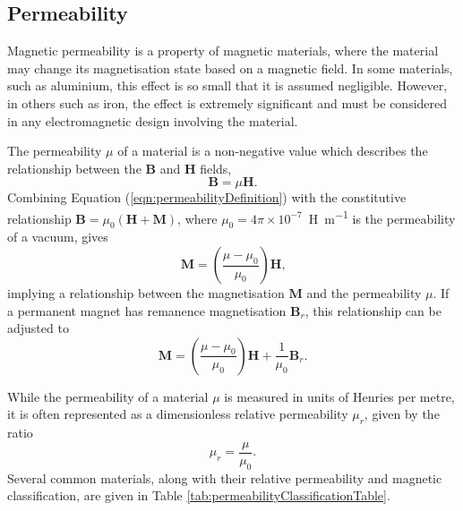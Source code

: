 \subsection{Permeability}
Magnetic permeability is a property of magnetic materials, where the material may change its magnetisation state based on a magnetic field. In some materials, such as aluminium, this effect is so small that it is assumed negligible. However, in others such as iron, the effect is extremely significant and must be considered in any electromagnetic design involving the material.

The permeability \(\mu\) of a material is a non-negative value which describes the relationship between the \(\mathbf{B}\) and \(\mathbf{H}\) fields,
\begin{equation}\label{eqn:permeabilityDefinition}
    \mathbf{B} = \mu \mathbf{H} \text{.}
\end{equation}
Combining Equation (\ref{eqn:permeabilityDefinition}) with the constitutive relationship \(\mathbf{B} = \mu_0 \left( \mathbf{H} + \mathbf{M} \right)\), where \(\mu_0 = 4\pi \times 10^{-7}\)~\si{\henry\per\metre} is the permeability of a vacuum, gives
\begin{equation}
    \mathbf{M} = \left( \frac{\mu-\mu_0}{\mu_0} \right) \mathbf{H} \text{,}
\end{equation}
implying a relationship between the magnetisation \(\mathbf{M}\) and the permeability \(\mu\). If a permanent magnet has remanence magnetisation \(\mathbf{B}_r\), this relationship can be adjusted to
\begin{equation}
    \mathbf{M} = \left( \frac{\mu-\mu_0}{\mu_0} \right) \mathbf{H} + \frac{1}{\mu_0} \mathbf{B}_r \text{.}
\end{equation}

While the permeability of a material \(\mu\) is measured in units of Henries per metre, it is often represented as a dimensionless relative permeability \(\mu_r\), given by the ratio
\begin{equation}
    \mu_r = \frac{\mu}{\mu_0} \text{.}
\end{equation}
Several common materials, along with their relative permeability and magnetic classification, are given in Table \ref{tab:permeabilityClassificationTable}.

